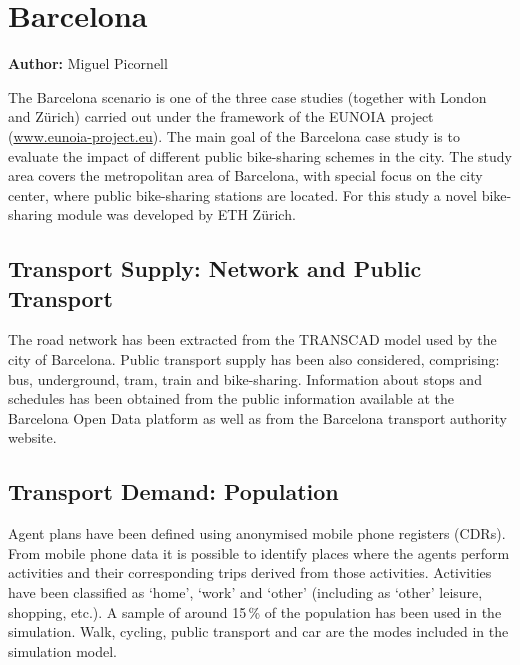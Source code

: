 \section{Barcelona}
\label{sec:barcelona}
\hfill \textbf{Author:} Miguel Picornell

The Barcelona scenario is one of the three case studies (together with London and Zürich) carried out under the framework of the EUNOIA project (\url{www.eunoia-project.eu}). The main goal of the Barcelona case study is to evaluate the impact of different public bike-sharing schemes in the city. The study area covers the metropolitan area of Barcelona, with special focus on the city center, where public bike-sharing stations are located. For this study a novel bike-sharing module was developed by ETH Zürich.

\subsection{Transport Supply: Network and Public Transport}
The road network has been extracted from the TRANSCAD model used by the city of Barcelona.  Public transport supply has been also considered, comprising: bus, underground, tram, train and bike-sharing. Information about stops and schedules has been obtained from the public information available at the Barcelona Open Data platform as well as from the Barcelona transport authority website. 

\subsection{Transport Demand: Population} 
Agent plans have been defined using anonymised mobile phone registers (CDRs). From mobile phone data it is possible to identify places where the agents perform activities and their corresponding trips derived from those activities. Activities have been classified as ‘home’, ‘work’ and ‘other’ (including as ‘other’ leisure, shopping, etc.). A sample of around 15\,\% of the population has been used in the simulation. Walk, cycling, public transport and car are the modes included in the simulation model.


